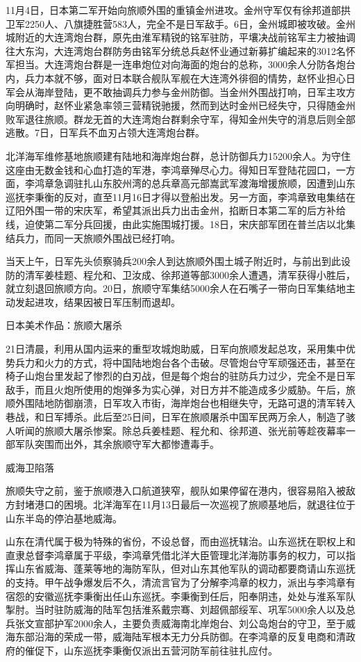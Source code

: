 \documentclass[12pt,UTF8]{ctexbook}
\begin{document}
11月4日，日本第二军开始向旅顺外围的重镇金州进攻。金州守军仅有徐邦道部拱卫军2250人、八旗捷胜营583人，完全不是日军敌手。6日，金州城即被攻破。金州城附近的大连湾炮台群，原先由淮军精锐的铭军驻防，平壤决战前铭军主力被抽调往大东沟，大连湾炮台群防务由铭军分统总兵赵怀业通过新募扩编起来的3012名怀军担当。大连湾炮台群是一连串炮位对向海面的炮台的总称，3000余人分防各炮台内，兵力本就不够，面对日本联合舰队军舰在大连湾外徘徊的情势，赵怀业担心日军会从海岸登陆，更不敢抽调兵力参与金州防御。当金州外围战打响，日军主攻方向明确时，赵怀业紧急率领三营精锐驰援，然而到达时金州已经失守，只得随金州败军退往旅顺。群龙无首的大连湾炮台群剩余守军，得知金州失守的消息后则全部逃散。7日，日军兵不血刃占领大连湾炮台群。

北洋海军维修基地旅顺建有陆地和海岸炮台群，总计防御兵力15200余人。为守住这座由无数金钱和心血打造的军港，李鸿章殚尽心力。得知日军登陆花园口，一方面，李鸿章急调驻扎山东胶州湾的总兵章高元部嵩武军渡海增援旅顺，因遭到山东巡抚李秉衡的反对，直至11月16日才得以登船出发。另一方面，李鸿章致电集结在辽阳外围一带的宋庆军，希望其派出兵力出击金州，掐断日本第二军的后方补给线，迫使第二军分兵回援，由此实施围城打援。18日，宋庆部军团在普兰店以北集结兵力，而同一天旅顺外围战已经打响。

当天上午，日军先头侦察骑兵200余人到达旅顺外围土城子附近时，与前出到此设防的清军姜桂题、程允和、卫汝成、徐邦道等部3000余人遭遇，清军获得小胜后，就立刻退回旅顺方向。20日，旅顺守军集结5000余人在石嘴子一带向日军集结地主动发起进攻，结果因被日军压制而退却。


日本美术作品：旅顺大屠杀

21日清晨，利用从国内运来的重型攻城炮助威，日军向旅顺发起总攻，采用集中优势兵力和火力的方式，将中国陆地炮台各个击破。尽管炮台守军顽强还击，甚至在椅子山炮台里发起了惨烈的白刃战，但是每个炮台的驻防兵力过少，完全不是日军敌手，而且火炮所使用的炮弹多为实心弹，对日方并不能造成多少威胁。午后，旅顺外围陆地防御崩溃，日军攻入市街，海岸炮台也相继失守，无路可退的清军转入巷战，和日军搏杀。此后至25日间，日军在旅顺屠杀中国军民两万余人，制造了骇人听闻的旅顺大屠杀惨案。除总兵姜桂题、程允和、徐邦道、张光前等趁夜幕率一部军队突围而出外，其余旅顺守军大都惨遭毒手。

威海卫陷落

旅顺失守之前，鉴于旅顺港入口航道狭窄，舰队如果停留在港内，很容易陷入被敌方封堵港口的困境。北洋海军在11月13日最后一次巡视了旅顺基地后，就退往位于山东半岛的停泊基地威海。

山东在清代属于极为特殊的省份，不设总督，而由巡抚辖治。山东巡抚在职权上和直隶总督李鸿章属于平级，李鸿章凭借北洋大臣管理北洋海防事务的权力，可以指挥山东省威海、蓬莱等地的海防军队，但对山东其他军队的调动都要商请山东巡抚的支持。甲午战争爆发后不久，清流言官为了分解李鸿章的权力，派出与李鸿章有宿怨的安徽巡抚李秉衡出任山东巡抚。李秉衡到任后，阳奉阴违，处处与淮系军队掣肘。当时驻防威海的陆军包括淮系戴宗骞、刘超佩部绥军、巩军5000余人以及总兵张文宣部护军2000余人，主要负责威海南北岸炮台、刘公岛炮台的守卫，至于威海东部沿海的荣成一带，威海陆军根本无力分兵防御。在李鸿章的反复电商和清政府的催促下，山东巡抚李秉衡仅派出五营河防军前往驻扎应付。
\end{document}
